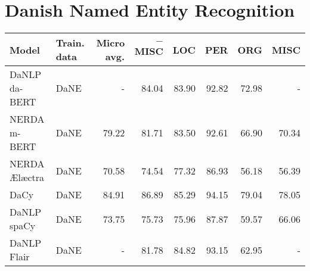 \documentclass[main.tex]{subfiles}
\begin{document}
\section{Danish Named Entity Recognition}%
\label{sec:Danish Named Entity Recognition}
\begin{table}                                                                                                                                                                                                                           
        \begin{center}                                                                                                                                                                                                                  
                \begin{tabular}{l l r r r r r r}                                                                                                                                                                                        
                        Model & Train. data & Micro avg. & $-$MISC & LOC & PER & ORG & MISC \\                                                                                                                                          
                        \hline                                                                                                                                                                                                          
                        DaNLP da-BERT & DaNE & - & 84.04 & 83.90 & 92.82 & 72.98 & - \\                                                                                                                                                 
                        NERDA m-BERT & DaNE & 79.22 & 81.71 & 83.50 & 92.61 & 66.90 & 70.34 \\                                                                                                                                          
                        NERDA Ælæctra & DaNE & 70.58 & 74.54 & 77.32 & 86.93 & 56.18 & 56.39 \\                     
                        DaCy & DaNE & 84.91 & 86.89 & 85.29 & 94.15 & 79.04 & 78.05 \\                              
                        DaNLP spaCy & DaNE & 73.75 & 75.73 & 75.96 & 87.87 & 59.57 & 66.06 \\                       
                        DaNLP Flair & DaNE & - & 81.78 & 84.82 & 93.15 & 62.95 & - \\                               

\end{tabular}
\end{center}
\end{table}
\end{document}
